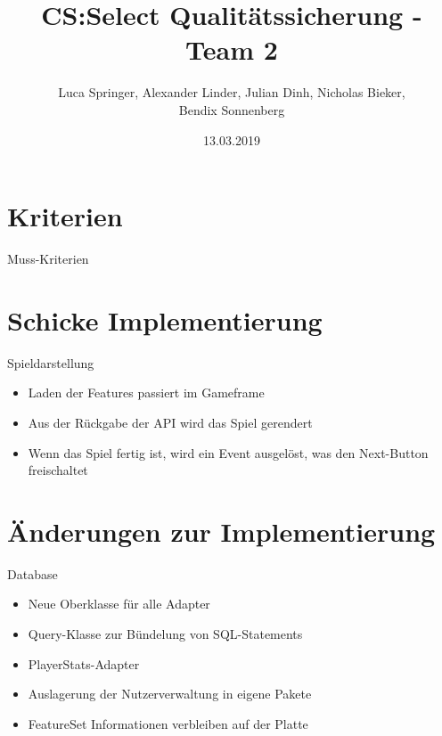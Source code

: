 \documentclass[xcolor=dvipsnames]{beamer}
\title[Team 2 - Implementierung]{CS:Select Qualitätssicherung - Team 2}
\author{Luca Springer, Alexander Linder, Julian Dinh, Nicholas Bieker,\\ Bendix Sonnenberg}
\date{13.03.2019}
\begin{document}
\begin{frame} %
  \titlepage
\end{frame}

\section{Kriterien}

\begin{frame}{Muss-Kriterien}

\end{frame}

\section{Schicke Implementierung}
\begin{frame}{Spieldarstellung}
\begin{itemize}
    \item Laden der Features passiert im Gameframe
    \item Aus der Rückgabe der API wird das Spiel gerendert
    \item Wenn das Spiel fertig ist, wird ein Event ausgelöst, was den Next-Button freischaltet
\end{itemize}
\end{frame}

\section{Änderungen zur Implementierung}
\begin{frame}{Database}
    \begin{itemize}
        \item Neue Oberklasse für alle Adapter
        \item Query-Klasse zur Bündelung von SQL-Statements
        \item PlayerStats-Adapter
        \item Auslagerung der Nutzerverwaltung in eigene Pakete
        \item FeatureSet Informationen verbleiben auf der Platte
    \end{itemize}
\end{frame}

\renewcommand{\arraystretch}{1.5}
\end{document}
